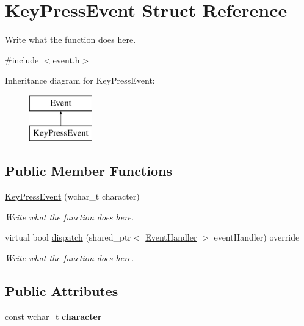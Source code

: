 \hypertarget{structKeyPressEvent}{\section{Key\+Press\+Event Struct Reference}
\label{structKeyPressEvent}
}


Write what the function does here.  




{\ttfamily \#include $<$event.\+h$>$}

Inheritance diagram for Key\+Press\+Event\+:\begin{figure}[H]
\begin{center}
\leavevmode
\includegraphics[height=2.000000cm]{structKeyPressEvent}
\end{center}
\end{figure}
\subsection*{Public Member Functions}
\begin{DoxyCompactItemize}
\item 
\hyperlink{structKeyPressEvent_a4d9766496d06b53ba5b594ed922082a8}{Key\+Press\+Event} (wchar\+\_\+t character)
\begin{DoxyCompactList}\small\item\em Write what the function does here. \end{DoxyCompactList}\item 
virtual bool \hyperlink{structKeyPressEvent_a1c0e591880a4e20864a5d910e062c7fb}{dispatch} (shared\+\_\+ptr$<$ \hyperlink{structEventHandler}{Event\+Handler} $>$ event\+Handler) override
\begin{DoxyCompactList}\small\item\em Write what the function does here. \end{DoxyCompactList}\end{DoxyCompactItemize}
\subsection*{Public Attributes}
\begin{DoxyCompactItemize}
\item 
\hypertarget{structKeyPressEvent_a07fd7ffa0d7ab155ecaaed3cfb087b43}{const wchar\+\_\+t {\bfseries character}}\label{structKeyPressEvent_a07fd7ffa0d7ab155ecaaed3cfb087b43}

\end{DoxyCompactItemize}
